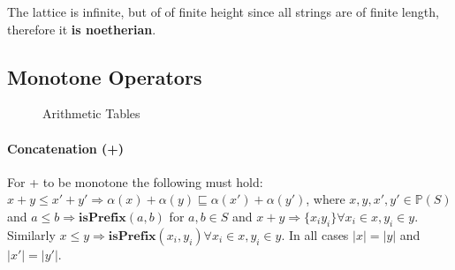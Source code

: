 \documentclass{article}
\newcommand{\powerset}[1]{\mathbb{P}(#1)}
\begin{document}
The lattice is infinite, but of of finite height since all strings are of finite length, therefore it \textbf{is noetherian}.

\subsection{Monotone Operators}
\begin{figure*}
\centering
{}

\caption{Arithmetic Tables}
\label{fig:table}
\end{figure*}


\paragraph{Concatenation (+)}
For + to be monotone the following must hold: $x+y \leq x'+y' \Rightarrow  \alpha(x)+\alpha(y) \sqsubseteq \alpha(x')+\alpha(y')$, where $x,y,x',y' \in \powerset{S}$ and $a \leq b \Rightarrow \mathbf{isPrefix}(a,b)$ for $a,b \in S$ and $x+y \Rightarrow \{x_{i}y_i\} \forall x_i \in x, y_i \in y$.  Similarly $x \leq y \Rightarrow \mathbf{isPrefix}(x_i, y_i) \forall x_i \in x, y_i \in y$.  In all cases $|x| = |y|$ and $|x'| = |y'|$.
\end{document}
